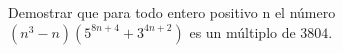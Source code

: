 Demostrar que para todo entero positivo n el número $(n^3 -n)(5^{8n+4} +3^{4n+2})$ es un múltiplo de $3804$.

